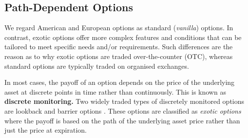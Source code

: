 \documentclass[a4paper]{report}
\begin{document}
\subsection{Path-Dependent Options}\label{section:discrete_monitoring}
We regard American and European options as standard (\textit{vanilla}) options. In contrast, exotic options offer more complex features and conditions that can be tailored to meet specific needs and/or requirements. Such differences are the reason as to why exotic options are traded over-the-counter (OTC)\footnotemark[1], whereas standard options are typically traded on organised exchanges\footnotemark[2]. 


In most cases, the payoff of an option depends on the price of the underlying asset at discrete points in time rather than continuously. This is known as \textbf{discrete monitoring.} Two widely traded types of discretely monitored options are lookback and barrier options \citep{dadachanji2015fx}. These options are classified as \textit{exotic options} where the payoff is based on the path of the underlying asset price rather than just the price at expiration.
\end{document}
